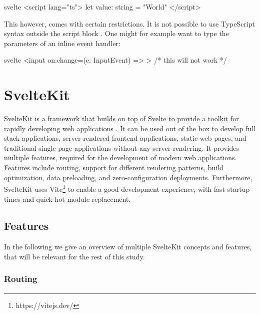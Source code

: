 \begin{myminted}{svelte}{}
<script lang="ts">
  let value: string = "World"
</script>
\end{myminted}

This however, comes with certain restrictions. It is not possible to use TypeScript syntax outside the script block \cite{noauthor_proposal_nodate}. One might for example want to type the parameters of an inline event handler:

\begin{myminted}{svelte}{}
<input on:change={(e: InputEvent) => {}}> /* this will not work */
\end{myminted}



\section{SvelteKit}
\label{sec:sveltekit}

SvelteKit is a framework that builds on top of Svelte to provide a toolkit for rapidly developing web applications \cite{noauthor_sveltekit_nodate}. It can be used out of the box to develop full stack applications, server rendered frontend applications, static web pages, and traditional single page applications without any server rendering. It provides multiple features, required for the development of modern web applications. Features include routing, support for different rendering patterns, build optimization, data preloading, and zero-configuration deployments. Furthermore, SvelteKit uses Vite\footnote{https://vitejs.dev/} to enable a good development experience, with fast startup times and quick hot module replacement.


\subsection{Features}
In the following we give an overview of multiple SvelteKit concepts and features, that will be relevant for the rest of this study.


\subsubsection{Routing}
\label{sec:sveltekit-routing}

